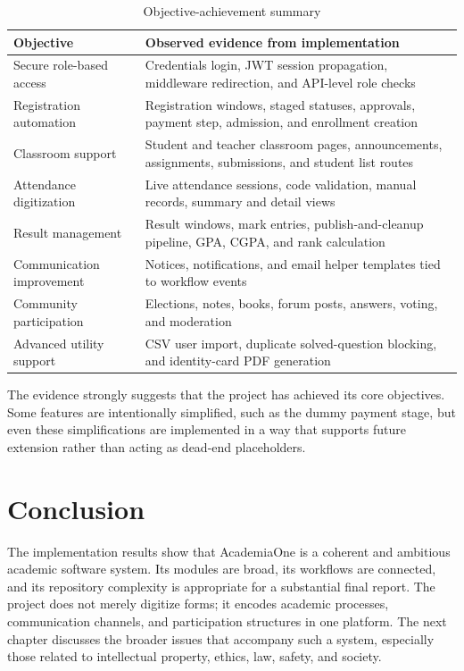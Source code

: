 \documentclass[12pt,a4paper]{report}
\newcommand{\systemName}{AcademiaOne}
\begin{document}
\begin{table}[H]
  \centering
  \caption{Objective-achievement summary}
  \label{tab:objective-achievement}
  \renewcommand{\arraystretch}{1.2}
  \begin{tabularx}{\textwidth}{p{2.3in}Y}
    \toprule
    \textbf{Objective} & \textbf{Observed evidence from implementation} \\
    \midrule
    Secure role-based access & Credentials login, JWT session propagation, middleware redirection, and API-level role checks \\
    Registration automation & Registration windows, staged statuses, approvals, payment step, admission, and enrollment creation \\
    Classroom support & Student and teacher classroom pages, announcements, assignments, submissions, and student list routes \\
    Attendance digitization & Live attendance sessions, code validation, manual records, summary and detail views \\
    Result management & Result windows, mark entries, publish-and-cleanup pipeline, GPA, CGPA, and rank calculation \\
    Communication improvement & Notices, notifications, and email helper templates tied to workflow events \\
    Community participation & Elections, notes, books, forum posts, answers, voting, and moderation \\
    Advanced utility support & CSV user import, duplicate solved-question blocking, and identity-card PDF generation \\
    \bottomrule
  \end{tabularx}
\end{table}

The evidence strongly suggests that the project has achieved its core objectives. Some features are intentionally simplified, such as the dummy payment stage, but even these simplifications are implemented in a way that supports future extension rather than acting as dead-end placeholders.

\section{Conclusion}
The implementation results show that \systemName{} is a coherent and ambitious academic software system. Its modules are broad, its workflows are connected, and its repository complexity is appropriate for a substantial final report. The project does not merely digitize forms; it encodes academic processes, communication channels, and participation structures in one platform. The next chapter discusses the broader issues that accompany such a system, especially those related to intellectual property, ethics, law, safety, and society.
\end{document}
